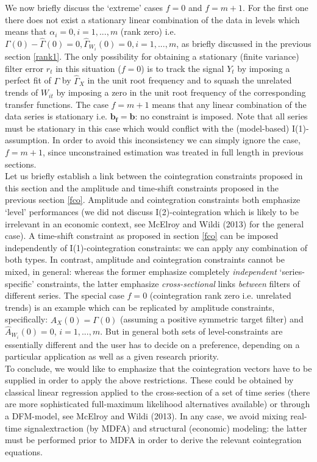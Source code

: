 \documentclass[11pt]{article}
\begin{document}
We now briefly discuss the `extreme' cases $f=0$ and $f=m+1$. For the first one there does not exist a stationary linear combination of the data in levels which means that $\alpha_i=0, i=1,...,m$ (rank zero) i.e. $\Gamma(0)-\hat{\Gamma}(0)=0, \hat{\Gamma}_{W_i}(0)=0, i=1,...,m$, as briefly discussed in the previous section \ref{rank1}. The only possibility for obtaining a stationary (finite variance) filter error $r_t$ in this situation ($f=0$) is to track the signal $Y_{t}$ by imposing a perfect fit of $\Gamma$ by $\hat{\Gamma}_X$ in the unit root frequency and to squash the unrelated trends of $W_{it}$ by imposing a zero in the unit root frequency of the corresponding transfer functions. The case $f=m+1$  means that any linear combination of the data series is stationary i.e. $\mathbf{b_f=b}$: no constraint is imposed. Note that all series must be stationary in this case which would conflict with the (model-based) I(1)-assumption. In order to avoid this inconsistency we can simply ignore the case, $f=m+1$, since unconstrained estimation was treated in full length in previous sections.      \\

Let us briefly establish a link between the cointegration constraints proposed in this section and the amplitude and time-shift constraints proposed in the previous section \ref{fco}. Amplitude and cointegration constraints both emphasize `level' performances (we did not discuss I(2)-cointegration which is likely to be irrelevant in an economic context, see McElroy and Wildi (2013) for the general case). A time-shift constraint as proposed in section \ref{fco} can be imposed independently of I(1)-cointegration constraints: we can apply any combination of both types. In contrast, amplitude and cointegration constraints cannot be mixed, in general: whereas the former emphasize completely \emph{independent} `series-specific' constraints, the latter emphasize \emph{cross-sectional} links \emph{between} filters of different series. The special case $f=0$ (cointegration rank zero i.e. unrelated trends) is an example which can be replicated by amplitude constraints, specifically:  $\hat{A}_X(0)=\Gamma(0)$ (assuming a positive symmetric target filter) and $\hat{A}_{W_i}(0)=0$, $i=1,...,m$. But in general both sets of level-constraints are essentially different and the user has to decide on a preference, depending on a particular application as well as a given  research priority. \\

To conclude, we would like to  emphasize that the cointegration vectors have to be supplied in order to apply the above restrictions. These could be obtained by classical linear regression applied to the cross-section of a set of time series (there are more sophisticated full-maximum likelihood alternatives available) or through a DFM-model, see McElroy and Wildi (2013). In any case, we avoid mixing real-time signalextraction (by MDFA) and structural (economic) modeling: the latter must be performed prior to MDFA in order to derive the relevant cointegration equations.
\end{document}
